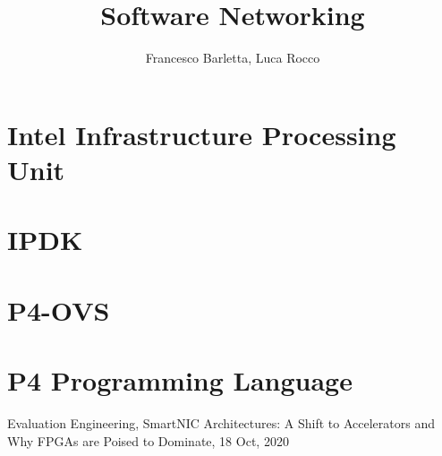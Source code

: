 \documentclass{article}
\title{Software Networking}
\begin{document}
\author{Francesco Barletta, Luca Rocco}

\maketitle

\section{Intel\raisebox {1mm}{\textregistered} Infrastructure Processing Unit}


\section{IPDK}


\section{P4-OVS}


\section{P4 Programming Language}


\begin{thebibliography}{1}
    Evaluation Engineering, SmartNIC Architectures: A Shift to Accelerators and Why FPGAs are Poised to Dominate, 18 Oct, 2020
\end{thebibliography}
\end{document}
